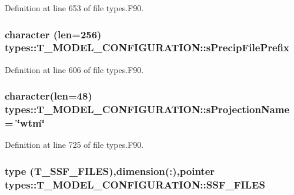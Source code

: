 Definition at line 653 of file types.F90.

\hypertarget{typetypes_1_1_t___m_o_d_e_l___c_o_n_f_i_g_u_r_a_t_i_o_n_ad10bbe871fbefd73373e6533207cbf35}{
\subsubsection[{sPrecipFilePrefix}]{\setlength{\rightskip}{0pt plus 5cm}character (len=256) {\bf types::T\_\-MODEL\_\-CONFIGURATION::sPrecipFilePrefix}}}
\label{typetypes_1_1_t___m_o_d_e_l___c_o_n_f_i_g_u_r_a_t_i_o_n_ad10bbe871fbefd73373e6533207cbf35}


Definition at line 606 of file types.F90.

\hypertarget{typetypes_1_1_t___m_o_d_e_l___c_o_n_f_i_g_u_r_a_t_i_o_n_a04cf64fadeec85d5a0fcfbb840a9c7f0}{
\subsubsection[{sProjectionName}]{\setlength{\rightskip}{0pt plus 5cm}character(len=48) {\bf types::T\_\-MODEL\_\-CONFIGURATION::sProjectionName} = \char`\"{}wtm\char`\"{}}}
\label{typetypes_1_1_t___m_o_d_e_l___c_o_n_f_i_g_u_r_a_t_i_o_n_a04cf64fadeec85d5a0fcfbb840a9c7f0}


Definition at line 725 of file types.F90.

\hypertarget{typetypes_1_1_t___m_o_d_e_l___c_o_n_f_i_g_u_r_a_t_i_o_n_a0a93cd1ea020beb57bae92e6c38c0d2a}{
\subsubsection[{SSF\_\-FILES}]{\setlength{\rightskip}{0pt plus 5cm}type ({\bf T\_\-SSF\_\-FILES}),dimension(:),pointer {\bf types::T\_\-MODEL\_\-CONFIGURATION::SSF\_\-FILES}}}
\label{typetypes_1_1_t___m_o_d_e_l___c_o_n_f_i_g_u_r_a_t_i_o_n_a0a93cd1ea020beb57bae92e6c38c0d2a}


